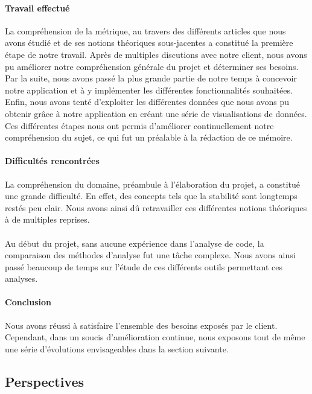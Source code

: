 \documentclass{scrartcl}
\begin{document}
    \paragraph{Travail effectué}La compréhension de la métrique, au travers des différents articles que nous avons étudié et de ses notions théoriques sous-jacentes a constitué la première étape de notre travail. Après de multiples discutions avec notre client, nous avons pu améliorer notre compréhension générale du projet et déterminer ses besoins. Par la suite, nous avons passé la plus grande partie de notre temps à concevoir notre application et à y implémenter les différentes fonctionnalités souhaitées. Enfin, nous avons tenté d'exploiter les différentes données que nous avons pu obtenir grâce à notre application en créant une série de visualisations de données. Ces différentes étapes nous ont permis d'améliorer continuellement notre compréhension du sujet, ce qui fut un préalable à la rédaction de ce mémoire.

    \paragraph{Difficultés rencontrées}La compréhension du domaine, préambule à l'élaboration du projet, a constitué une grande difficulté. En effet, des concepts tels que la stabilité sont longtemps restés peu clair. Nous avons ainsi dû retravailler ces différentes notions théoriques à de multiples reprises. 
    
    \paragraph{}Au début du projet, sans aucune expérience dans l'analyse de code, la comparaison des méthodes d'analyse fut une tâche complexe. Nous avons ainsi passé beaucoup de temps sur l'étude de ces différents outils permettant ces analyses.

    \paragraph{Conclusion}Nous avons réussi à satisfaire l'ensemble des besoins exposés par le client. Cependant, dans un soucis d'amélioration continue, nous exposons tout de même une série d'évolutions envisageables dans la section suivante.
    

\subsection{Perspectives}
    
\end{document}
